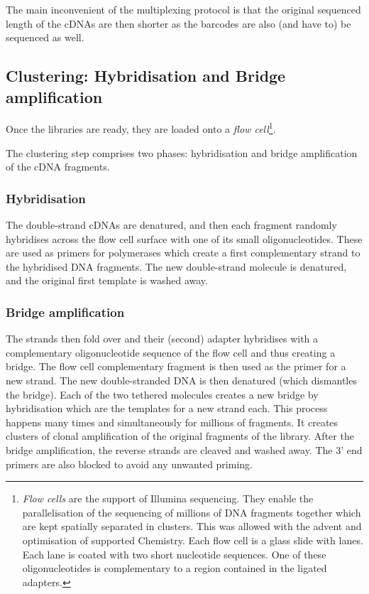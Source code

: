 The main inconvenient of the multiplexing protocol is that the original sequenced
length of the \glspl{cDNA} are then shorter as the barcodes are also (and have
to) be sequenced as well.\mybr\

\subsection[Clustering: Hybridisation and Bridge amplification]{Clustering:
Hybridisation and Bridge amplification~\small{}\quad}%
\label{sub:HybridClustAmp}

\vspace{-4mm}
Once the libraries are ready, they are loaded onto a \emph{flow cell}\footnote{%
\emph{Flow cells} are the support of Illumina sequencing. They enable the
parallelisation of the sequencing of millions of \gls{DNA} fragments together
which are kept spatially separated in clusters. This was allowed with the advent
and optimisation of supported Chemistry. Each flow cell is a glass slide with
lanes. Each lane is coated with two short nucleotide sequences. One of these
oligonucleotides is complementary to a region contained in the ligated adapters.}.\mybr\

The clustering step comprises two phases: hybridisation and bridge amplification
of the \gls{cDNA} fragments.\mybr\

\subsubsection{Hybridisation}

The double-strand \glspl{cDNA} are denatured, and then each fragment randomly
hybridises across the flow cell surface with one of its small oligonucleotides.
These are used as primers for polymerases which create a first complementary
strand to the hybridised \gls{DNA} fragments. The new double-strand molecule is
denatured, and the original first template is washed away.\mybr\

\subsubsection{Bridge amplification}
The strands then fold over and their (second) adapter hybridises with a
complementary oligonucleotide sequence of the flow cell and thus creating a
bridge. The flow cell complementary fragment is then used as the primer for a new
strand. The new double-stranded \gls{DNA} is then denatured (which
dismantles the bridge). Each of the two tethered molecules creates a new
bridge by hybridisation which are the templates for a new strand each.
This process happens many times and simultaneously for millions of fragments.
It creates clusters of clonal amplification of the original fragments of
the library. After the bridge amplification, the reverse strands are cleaved
and washed away. The 3' end primers are also blocked to avoid any unwanted
priming.\mybr\

